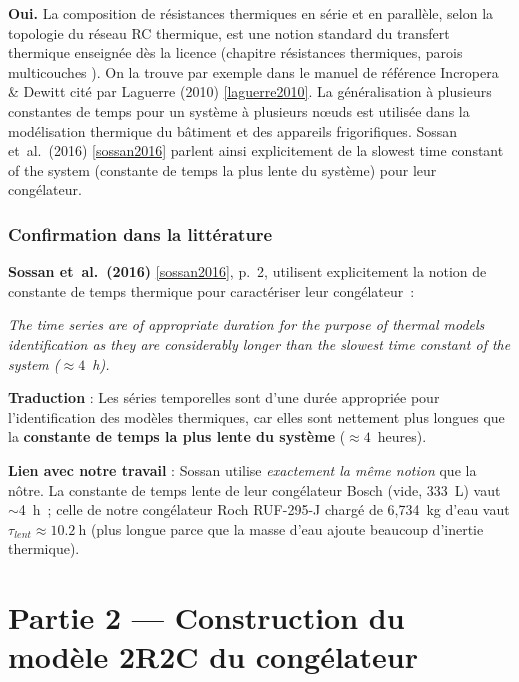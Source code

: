 \documentclass[11pt,a4paper]{article}
\begin{document}
\textbf{Oui.} La composition de résistances thermiques en série et en parallèle, selon la
topologie du réseau RC thermique, est une notion standard du transfert thermique enseignée
dès la licence (chapitre \og résistances thermiques, parois multicouches \fg{}). On la
trouve par exemple dans le manuel de référence Incropera \& Dewitt cité par Laguerre
(2010) \ref{laguerre2010}. La généralisation à plusieurs constantes de temps pour un
système à plusieurs nœuds est utilisée dans la modélisation thermique du bâtiment et des
appareils frigorifiques. Sossan et~al.\ (2016) \ref{sossan2016} parlent ainsi explicitement
de la \og slowest time constant of the system \fg{} (constante de temps la plus lente du
système) pour leur congélateur.

\subsubsection*{Confirmation dans la littérature}

\textbf{Sossan et~al.\ (2016)} \ref{sossan2016}, p.~2, utilisent explicitement la notion
de constante de temps thermique pour caractériser leur congélateur~:

\begin{tcolorbox}[breakable,enhanced jigsaw,colback=yellow!10,colframe=yellow!50!black,boxrule=0.4pt,arc=2pt]
\og{} \emph{The time series are of appropriate duration for the purpose of thermal models
identification as they are considerably longer than the slowest time constant of the
system ($\approx 4$~h).} \fg{}
\end{tcolorbox}

\textbf{Traduction} : \og{} Les séries temporelles sont d'une durée appropriée pour
l'identification des modèles thermiques, car elles sont nettement plus longues que la
\textbf{constante de temps la plus lente du système} ($\approx 4$~heures). \fg{}

\textbf{Lien avec notre travail} : Sossan utilise \emph{exactement la même notion} que la
nôtre. La constante de temps lente de leur congélateur Bosch (vide, 333~L) vaut $\sim$4~h~;
celle de notre congélateur Roch RUF-295-J chargé de 6,734~kg d'eau vaut $\tau_{lent} \approx
\SI{10,2}{\hour}$ (plus longue parce que la masse d'eau ajoute beaucoup d'inertie thermique).

\section{Partie 2 — Construction du modèle 2R2C du congélateur}
\end{document}
